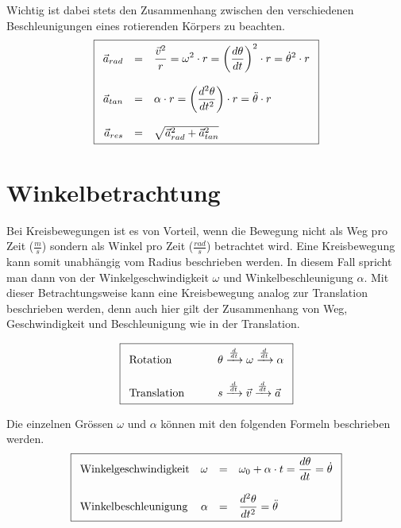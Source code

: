 \noindent
Wichtig ist dabei stets den Zusammenhang zwischen den verschiedenen 
Beschleunigungen eines rotierenden Körpers zu beachten.
\[ \boxed{\begin{array}{r c l}
	\vec{a}_{rad} 
		&=& \displaystyle \frac{\vec{v}^2}{r} 
		= \displaystyle \omega^2 \cdot r
		= \displaystyle \left(\frac{d\theta}{dt}\right)^2 \cdot r
		= \displaystyle \dot{\theta}^2 \cdot r \\
	& & \\
	\vec{a}_{tan} 
		&=& \displaystyle \alpha \cdot r
		= \displaystyle \left(\frac{d^2\theta}{dt^2}\right) \cdot r
		= \displaystyle \ddot{\theta} \cdot r \\
	& & \\
	\vec{a}_{res} 
		&=& \sqrt{\vec{a}_{rad}^2 + \vec{a}_{tan}^2} 
\end{array} }\]

\section{Winkelbetrachtung}\label{sec:winkelbetrachtung}
Bei Kreisbewegungen ist es von Vorteil, wenn die Bewegung nicht als
Weg pro Zeit ($\frac{m}{s}$) sondern als Winkel pro Zeit 
($\frac{rad}{s}$) betrachtet wird. Eine Kreisbewegung kann somit 
unabhängig vom Radius beschrieben werden. In diesem Fall spricht
man dann von der Winkelgeschwindigkeit $\omega$ und 
Winkelbeschleunigung $\alpha$. Mit dieser Betrachtungsweise kann
eine Kreisbewegung analog zur Translation beschrieben werden, denn
auch hier gilt der Zusammenhang von Weg, Geschwindigkeit und 
Beschleunigung wie in der Translation.

\[ \boxed{ \begin{array}{l l}
	\text{Rotation} \qquad &
		\theta
		\xrightarrow{\frac{d}{dt}} \omega 
		\xrightarrow{\frac{d}{dt}} \alpha \\
	& \\
	\text{Translation} \qquad &
		s
		\xrightarrow{\frac{d}{dt}} \vec{v} 
		\xrightarrow{\frac{d}{dt}} \vec{a}
\end{array} }\]

\noindent
Die einzelnen Grössen $\omega$ und $\alpha$ können mit den folgenden 
Formeln beschrieben werden.
\[ \boxed{\begin{array}{l r c l}
	\text{Winkelgeschwindigkeit} &
		\omega &=& \omega_0 + \alpha \cdot t 
			= \displaystyle \frac{d\theta}{dt} 
			= \displaystyle \dot{\theta} \\
	& & \\
	\text{Winkelbeschleunigung} &
		\alpha &=& \displaystyle \frac{d^2\theta}{dt^2} = \ddot{\theta}
\end{array} }\]

